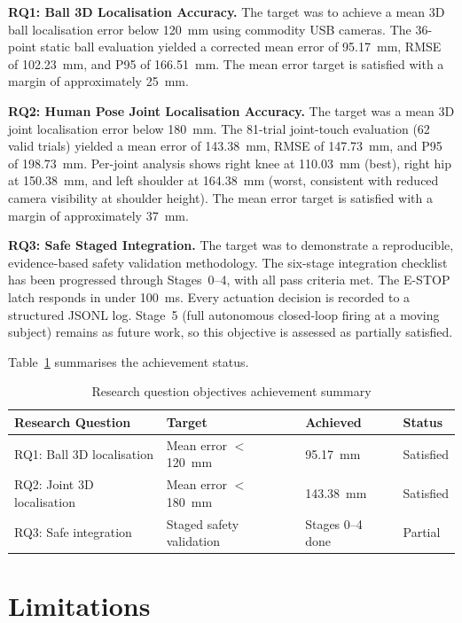 \textbf{RQ1: Ball 3D Localisation Accuracy.} The target was to achieve a mean 3D ball localisation error below 120~mm using commodity USB cameras. The 36-point static ball evaluation yielded a corrected mean error of 95.17~mm, RMSE of 102.23~mm, and P95 of 166.51~mm. The mean error target is satisfied with a margin of approximately 25~mm.

\textbf{RQ2: Human Pose Joint Localisation Accuracy.} The target was a mean 3D joint localisation error below 180~mm. The 81-trial joint-touch evaluation (62 valid trials) yielded a mean error of 143.38~mm, RMSE of 147.73~mm, and P95 of 198.73~mm. Per-joint analysis shows right knee at 110.03~mm (best), right hip at 150.38~mm, and left shoulder at 164.38~mm (worst, consistent with reduced camera visibility at shoulder height). The mean error target is satisfied with a margin of approximately 37~mm.

\textbf{RQ3: Safe Staged Integration.} The target was to demonstrate a reproducible, evidence-based safety validation methodology. The six-stage integration checklist has been progressed through Stages~0--4, with all pass criteria met. The E-STOP latch responds in under 100~ms. Every actuation decision is recorded to a structured JSONL log. Stage~5 (full autonomous closed-loop firing at a moving subject) remains as future work, so this objective is assessed as partially satisfied.

Table~\ref{tab:6_1} summarises the achievement status.

\begin{table}[htbp]
\centering
\caption{Research question objectives achievement summary}
\label{tab:6_1}
\begin{tabularx}{\textwidth}{|l|X|l|l|}
\hline
\textbf{Research Question} & \textbf{Target} & \textbf{Achieved} & \textbf{Status} \\
\hline
RQ1: Ball 3D localisation & Mean error $<$ 120~mm & 95.17~mm & Satisfied \\
\hline
RQ2: Joint 3D localisation & Mean error $<$ 180~mm & 143.38~mm & Satisfied \\
\hline
RQ3: Safe integration & Staged safety validation & Stages 0--4 done & Partial \\
\hline
\end{tabularx}
\end{table}

\section{Limitations}

